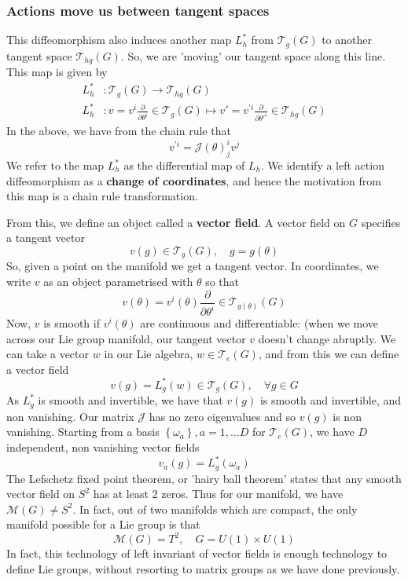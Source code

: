 \subsubsection{Actions move us between tangent spaces} 
This diffeomorphism 
also induces another map $ L^ * _{ h } $ from $ \mathcal{ T }_ g ( G ) $
to another tangent space $ \mathcal{ T }_{ hg } ( G ) $. So, 
we are 'moving' our tangent space along this line. 
This map is given by 
\begin{align*}
	L^*_{ h } & : \mathcal{T }_ g ( G ) \to \mathcal{ T }_{hg } ( G ) \\
	L^*_{ h } & : v = v^{ i } \frac{\partial }{\partial \theta ^ i } \in \mathcal{ T }_ g ( G ) \mapsto v' = v^{ ' i } \frac{\partial }{\partial \theta'^{i } } \in \mathcal{ T }_{ hg }( G ) 
\end{align*} In the above, we have from the chain rule that 
\[
	v^{' i }  = \mathcal{ J }( \theta )^ i _j v ^ j 
\]  We refer to the map $ L_ h ^ * $ as the differential map of 
$ L _ h $. We identify a left action diffeomorphism 
as a \textbf{change of coordinates}, and hence 
the motivation from this map is a chain rule transformation. 


From this, we define an object called a \textbf{vector field}. 
A vector field on $ G $ specifies a tangent vector
\[
	v ( g) \in \mathcal{ T }_g ( G ) , \quad g = g( \theta ) 
\] So, given a point on the manifold we get a tangent vector. 
In coordinates, we write $ v $ as an object parametrised with $ \theta $ 
so that 
\[
	v ( \theta) = v ^ i ( \theta) \frac{\partial }{\partial \theta^ i} \in \mathcal{ T }_{ g ( \theta) }( G )  
\] Now, $ v  $ is smooth if $ v^ i ( \theta) $ are continuous and differentiable: 
(when we move across our Lie group manifold, our 
tangent vector $ v $ doesn't change abruptly. 
We can take a vector $w$ in our Lie algebra, $ w  \in \mathcal{ T }_ e( G ) $, 
and from this we can define a vector field 
\[
	v ( g ) = L^ *_g ( w ) \in \mathcal{ T }_ g ( G ), \quad \forall g \in G 
\] As $ L ^ * _ g $ is smooth and invertible, we 
have that $ v ( g ) $ is smooth and invertible, and non vanishing. Our matrix
$ \mathcal{ J }  $ has no zero eigenvalues and so $ v ( g ) $ is non vanishing. 
Starting from a basis  $ \left\{  \omega_ a  \right\} , a = 1 , \dots D $ for $ \mathcal{ T }_ e ( G ) $, 
we have $ D $ independent, non vanishing vector fields 
\[
 v_a ( g)  = L ^ * _ g ( \omega_ a ) 
\] The Lefschetz fixed point theorem, or 'hairy ball theorem' 
states that any smooth vector field on $ S^ 2 $ has at least $  2$ zeros. 
Thus for our manifold, we have $ \mathcal{ M } ( G ) \neq S^ 2 $. In fact, 
out of two manifolds which are compact, the only manifold possible for a 
Lie group is that 
\[
	\mathcal{ M } ( G )  = T ^2, \quad G = U ( 1) \times U ( 1) 
\] In fact, this technology of left invariant of vector fields 
is enough technology to define Lie groups, without resorting to matrix groups 
as we have done previously.

